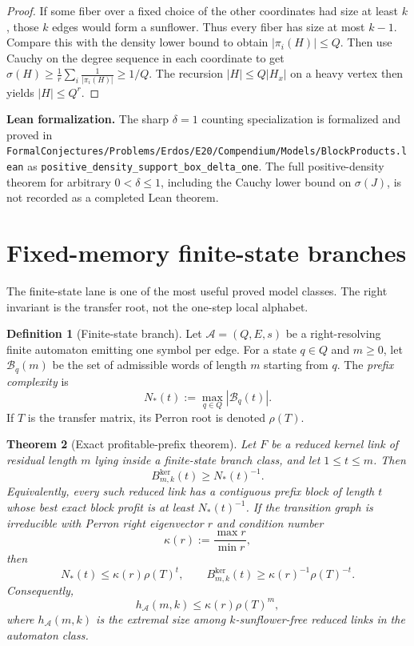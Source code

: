 \documentclass[11pt]{article}
\newtheorem{theorem}{Theorem}[section]
\theoremstyle{definition}
\newtheorem{definition}[theorem]{Definition}
\newcommand{\1}{\mathbf{1}}
\newcommand{\leannote}[1]{\par\smallskip\noindent\textbf{Lean formalization.} #1\par\smallskip}
\begin{document}
\begin{proof}
If some fiber over a fixed choice of the other coordinates had size at least $k$, those $k$ edges would form a sunflower. Thus every fiber has size at most $k-1$. Compare this with the density lower bound to obtain $|\pi_i(H)|\le Q$. Then use Cauchy on the degree sequence in each coordinate to get $\sigma(H)\ge \frac{1}{r}\sum_i \frac1{|\pi_i(H)|}\ge 1/Q$. The recursion $|H|\le Q|H_x|$ on a heavy vertex then yields $|H|\le Q^r$.
\end{proof}

\leannote{The sharp \(\delta=1\) counting specialization is formalized and proved in \texttt{FormalConjectures/Problems/Erdos/E20/Compendium/Models/BlockProducts.lean} as \texttt{positive\_density\_support\_box\_delta\_one}. The full positive-density theorem for arbitrary \(0<\delta\le 1\), including the Cauchy lower bound on \(\sigma(J)\), is not recorded as a completed Lean theorem.}

\section{Fixed-memory finite-state branches}\label{sec:finite-state}
The finite-state lane is one of the most useful proved model classes. The right invariant is the transfer root, not the one-step local alphabet.

\begin{definition}[Finite-state branch]
Let $\mathcal A=(Q,E,s)$ be a right-resolving finite automaton emitting one symbol per edge. For a state $q\in Q$ and $m\ge 0$, let $\mathcal B_q(m)$ be the set of admissible words of length $m$ starting from $q$. The \emph{prefix complexity} is
\[
N_*(t):=\max_{q\in Q} |\mathcal B_q(t)|.
\]
If $T$ is the transfer matrix, its Perron root is denoted $\rho(T)$.
\end{definition}

\begin{theorem}[Exact profitable-prefix theorem]\label{thm:finite-state-prefix}
Let $F$ be a reduced kernel link of residual length $m$ lying inside a finite-state branch class, and let $1\le t\le m$. Then
\[
B^{\ker}_{m,k}(t)\ge N_*(t)^{-1}.
\]
Equivalently, every such reduced link has a contiguous prefix block of length $t$ whose best exact block profit is at least $N_*(t)^{-1}$.
If the transition graph is irreducible with Perron right eigenvector $r$ and condition number
\[
\kappa(r):=\frac{\max r}{\min r},
\]
then
\[
N_*(t)\le \kappa(r)\rho(T)^t,
\qquad
B^{\ker}_{m,k}(t)\ge \kappa(r)^{-1}\rho(T)^{-t}.
\]
Consequently,
\[
h_{\mathcal A}(m,k)\le \kappa(r)\rho(T)^m,
\]
where $h_{\mathcal A}(m,k)$ is the extremal size among $k$-sunflower-free reduced links in the automaton class.
\end{theorem}
\end{document}
